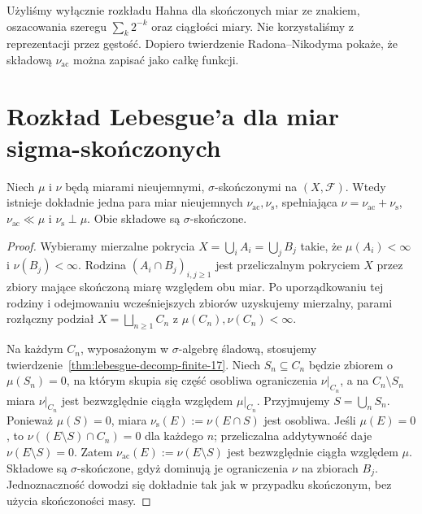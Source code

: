 \begin{uwaga}
Użyliśmy wyłącznie rozkładu Hahna dla skończonych miar ze
znakiem, oszacowania szeregu $\sum_k2^{-k}$ oraz ciągłości
miary. Nie korzystaliśmy z reprezentacji przez gęstość.
Dopiero twierdzenie Radona--Nikodyma pokaże, że składową
$\nu_{\mathrm{ac}}$ można zapisać jako całkę funkcji.
\end{uwaga}

\section{Rozkład Lebesgue'a dla miar sigma-skończonych}
\begin{twierdzenie}
\label{thm:lebesgue-decomp-sigfin-17}
Niech $\mu$ i $\nu$ będą miarami nieujemnymi,
$\sigma$-skończonymi na $(X,\mathcal F)$.
Wtedy istnieje dokładnie jedna para miar nieujemnych
$\nu_{\mathrm{ac}},\nu_{\mathrm{s}}$, spełniająca
$\nu=\nu_{\mathrm{ac}}+\nu_{\mathrm{s}}$,
$\nu_{\mathrm{ac}}\ll\mu$ i $\nu_{\mathrm{s}}\perp\mu$.
Obie składowe są $\sigma$-skończone.
\end{twierdzenie}
\begin{proof}
Wybieramy mierzalne pokrycia
$X=\bigcup_iA_i=\bigcup_jB_j$ takie, że
$\mu(A_i)<\infty$ i $\nu(B_j)<\infty$.
Rodzina $(A_i\cap B_j)_{i,j\ge1}$ jest przeliczalnym
pokryciem $X$ przez zbiory mające skończoną miarę
względem obu miar. Po uporządkowaniu tej rodziny
i odejmowaniu wcześniejszych zbiorów uzyskujemy
mierzalny, parami rozłączny podział $X=\bigsqcup_{n\ge1}C_n$
z $\mu(C_n),\nu(C_n)<\infty$.

Na każdym $C_n$, wyposażonym w $\sigma$-algebrę śladową,
stosujemy twierdzenie~\ref{thm:lebesgue-decomp-finite-17}.
Niech $S_n\subseteq C_n$ będzie zbiorem o
$\mu(S_n)=0$, na którym skupia się część osobliwa
ograniczenia $\nu|_{C_n}$, a na $C_n\setminus S_n$
miara $\nu|_{C_n}$ jest bezwzględnie ciągła względem
$\mu|_{C_n}$. Przyjmujemy $S=\bigcup_nS_n$.
Ponieważ $\mu(S)=0$, miara
$\nu_{\mathrm{s}}(E):=\nu(E\cap S)$ jest osobliwa.
Jeśli $\mu(E)=0$, to
$\nu((E\setminus S)\cap C_n)=0$ dla każdego $n$;
przeliczalna addytywność daje $\nu(E\setminus S)=0$.
Zatem $\nu_{\mathrm{ac}}(E):=\nu(E\setminus S)$
jest bezwzględnie ciągła względem $\mu$.
Składowe są $\sigma$-skończone, gdyż dominują je
ograniczenia $\nu$ na zbiorach $B_j$.
Jednoznaczność dowodzi się dokładnie tak jak
w przypadku skończonym, bez użycia skończoności masy.
\end{proof}


